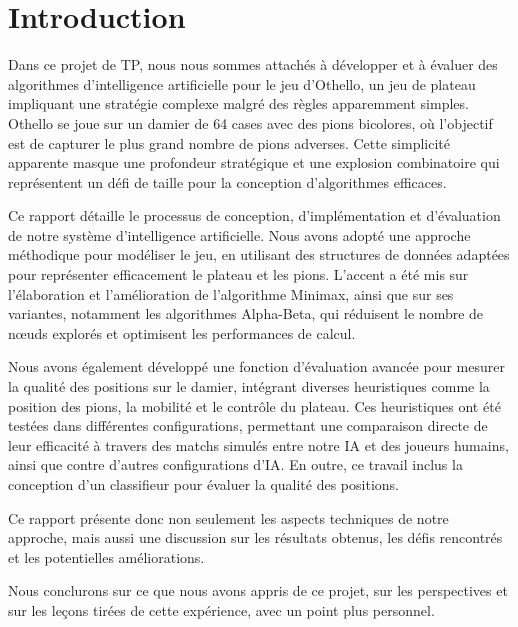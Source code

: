 \chapter{Introduction}
\label{chap:introduction}

Dans ce projet de \ac{TP}, nous nous sommes attachés à développer et à évaluer des algorithmes d'intelligence artificielle pour le jeu d'Othello, un jeu de plateau impliquant une stratégie complexe malgré des règles apparemment simples. Othello se joue sur un damier de 64 cases avec des pions bicolores, où l'objectif est de capturer le plus grand nombre de pions adverses. Cette simplicité apparente masque une profondeur stratégique et une explosion combinatoire qui représentent un défi de taille pour la conception d'algorithmes efficaces.

Ce rapport détaille le processus de conception, d'implémentation et d'évaluation de notre système d'intelligence artificielle. Nous avons adopté une approche méthodique pour modéliser le jeu, en utilisant des structures de données adaptées pour représenter efficacement le plateau et les pions. L'accent a été mis sur l'élaboration et l'amélioration de l'algorithme Minimax, ainsi que sur ses variantes, notamment les algorithmes Alpha-Beta, qui réduisent le nombre de nœuds explorés et optimisent les performances de calcul.

Nous avons également développé une fonction d'évaluation avancée pour mesurer la qualité des positions sur le damier, intégrant diverses heuristiques comme la position des pions, la mobilité et le contrôle du plateau. Ces heuristiques ont été testées dans différentes configurations, permettant une comparaison directe de leur efficacité à travers des matchs simulés entre notre IA et des joueurs humains, ainsi que contre d'autres configurations d'IA. En outre, ce travail inclus la conception d'un classifieur pour évaluer la qualité des positions. 

Ce rapport présente donc non seulement les aspects techniques de notre approche, mais aussi une discussion sur les résultats obtenus, les défis rencontrés et les potentielles améliorations.

Nous conclurons sur ce que nous avons appris de ce projet, sur les perspectives et sur les leçons tirées de cette expérience, avec un point plus personnel.